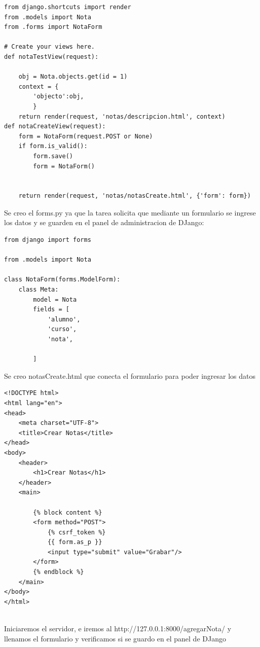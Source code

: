 \documentclass{article}
\begin{document}
\begin{lstlisting}
from django.shortcuts import render
from .models import Nota
from .forms import NotaForm

# Create your views here.
def notaTestView(request):
    
    obj = Nota.objects.get(id = 1)
    context = {
        'objecto':obj,
        }
    return render(request, 'notas/descripcion.html', context)
def notaCreateView(request):
    form = NotaForm(request.POST or None)
    if form.is_valid():
        form.save()
        form = NotaForm()
        
    
    return render(request, 'notas/notasCreate.html', {'form': form})

\end{lstlisting}

 \item Se creo el forms.py ya que la tarea solicita que mediante un formulario se ingrese los datos y se guarden en  el panel de administracion de DJango:
	
\begin{lstlisting}
from django import forms

from .models import Nota

class NotaForm(forms.ModelForm):
    class Meta:
        model = Nota
        fields = [
            'alumno',
            'curso',
            'nota',
            
        ]

\end{lstlisting}

 \item Se creo  notasCreate.html que conecta el formulario para poder ingresar los datos
 
\begin{lstlisting}
<!DOCTYPE html>
<html lang="en">
<head>
    <meta charset="UTF-8">
    <title>Crear Notas</title>
</head>
<body>
    <header>
        <h1>Crear Notas</h1>
    </header>
    <main>

        {% block content %}
        <form method="POST">
            {% csrf_token %}
            {{ form.as_p }}
            <input type="submit" value="Grabar"/>
        </form>
        {% endblock %}
    </main>
</body>
</html>


\end{lstlisting}

 \item Iniciaremos el servidor, e iremos al http://127.0.0.1:8000/agregarNota/ y llenamos el formulario y verificamos si se guardo en el panel de DJango
\end{document}
